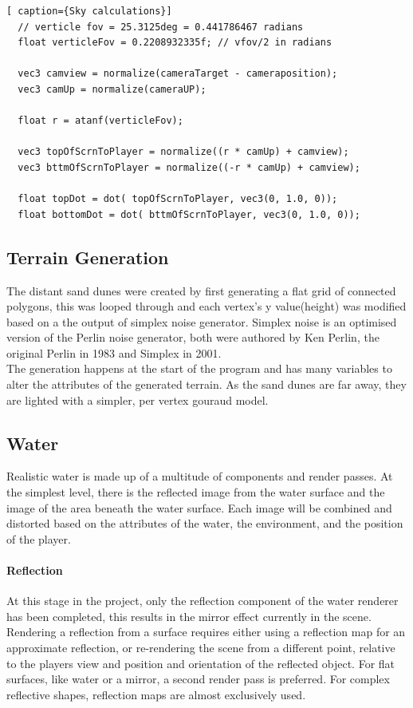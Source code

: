 \documentclass[conference]{acmsiggraph}
\begin{document}
\begin{lstlisting}[ caption={Sky calculations}]
  // verticle fov = 25.3125deg = 0.441786467 radians
  float verticleFov = 0.2208932335f; // vfov/2 in radians

  vec3 camview = normalize(cameraTarget - cameraposition);
  vec3 camUp = normalize(cameraUP);

  float r = atanf(verticleFov);

  vec3 topOfScrnToPlayer = normalize((r * camUp) + camview);
  vec3 bttmOfScrnToPlayer = normalize((-r * camUp) + camview);

  float topDot = dot( topOfScrnToPlayer, vec3(0, 1.0, 0));
  float bottomDot = dot( bttmOfScrnToPlayer, vec3(0, 1.0, 0));
\end{lstlisting}


\subsection{Terrain Generation}
The distant sand dunes were created by first generating a flat grid of connected polygons, this was looped through and each vertex's y value(height) was modified based on a the output of simplex noise generator. Simplex noise is an optimised version of the Perlin noise generator, both were authored by Ken Perlin, the original Perlin in 1983 and Simplex in 2001.\\
The generation happens at the start of the program and has many variables to alter the attributes of the generated terrain. As the sand dunes are far away, they are lighted with a simpler, per vertex gouraud model.

\subsection{Water}

Realistic water is made up of a multitude of components and render passes. At the simplest level, there is the reflected image from the water surface and the image of the area beneath the water surface. Each image will be combined and distorted based on the attributes of the water, the environment, and the position of the player.

\paragraph{Reflection}
At this stage in the project, only the reflection component of the water renderer has been completed, this results in the mirror effect currently in the scene. Rendering a reflection from a surface requires either using a reflection map for an approximate reflection, or re-rendering the scene from a different point, relative to the players view and position and orientation of the reflected object.
For flat surfaces, like water or a mirror, a second render pass is preferred. For complex reflective shapes, reflection maps are almost exclusively used.
\end{document}
